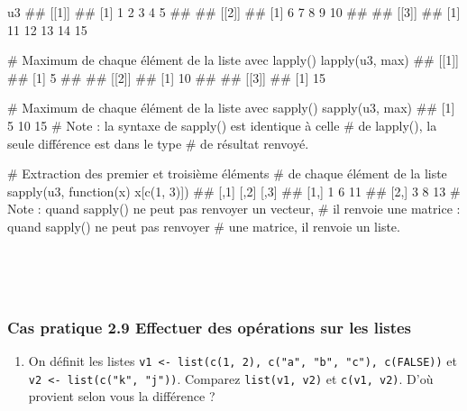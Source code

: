 \documentclass[12pt,twosided, notitlepage]{book}
\newenvironment{Shaded}{}{}
\newcommand{\CommentTok}[1]{\textcolor[rgb]{0.00,0.50,0.00}{#1}}
\newcommand{\ControlFlowTok}[1]{\textcolor[rgb]{0.00,0.00,1.00}{#1}}
\newcommand{\DecValTok}[1]{#1}
\newcommand{\KeywordTok}[1]{\textcolor[rgb]{0.00,0.00,1.00}{#1}}
\newcommand{\NormalTok}[1]{#1}
\providecommand{\tightlist}{%
  \setlength{\itemsep}{0pt}\setlength{\parskip}{0pt}}
\renewenvironment{Shaded}{\begin{snugshade}}{\end{snugshade}}
\begin{document}
\begin{Shaded}
\begin{Highlighting}[]
\NormalTok{u3}
\NormalTok{  ## [[1]]}
\NormalTok{  ## [1] 1 2 3 4 5}
\NormalTok{  ## }
\NormalTok{  ## [[2]]}
\NormalTok{  ## [1]  6  7  8  9 10}
\NormalTok{  ## }
\NormalTok{  ## [[3]]}
\NormalTok{  ## [1] 11 12 13 14 15}

\CommentTok{# Maximum de chaque élément de la liste avec lapply()}
\KeywordTok{lapply}\NormalTok{(u3, max)}
\NormalTok{  ## [[1]]}
\NormalTok{  ## [1] 5}
\NormalTok{  ## }
\NormalTok{  ## [[2]]}
\NormalTok{  ## [1] 10}
\NormalTok{  ## }
\NormalTok{  ## [[3]]}
\NormalTok{  ## [1] 15}

\CommentTok{# Maximum de chaque élément de la liste avec sapply()}
\KeywordTok{sapply}\NormalTok{(u3, max)}
\NormalTok{  ## [1]  5 10 15}
\CommentTok{# Note : la syntaxe de sapply() est identique à celle}
\CommentTok{# de lapply(), la seule différence est dans le type}
\CommentTok{# de résultat renvoyé.}

\CommentTok{# Extraction des premier et troisième éléments }
\CommentTok{# de chaque élément de la liste}
\KeywordTok{sapply}\NormalTok{(u3, }\ControlFlowTok{function}\NormalTok{(x) x[}\KeywordTok{c}\NormalTok{(}\DecValTok{1}\NormalTok{, }\DecValTok{3}\NormalTok{)])}
\NormalTok{  ##      [,1] [,2] [,3]}
\NormalTok{  ## [1,]    1    6   11}
\NormalTok{  ## [2,]    3    8   13}
\CommentTok{# Note : quand sapply() ne peut pas renvoyer un vecteur, }
\CommentTok{# il renvoie une matrice : quand sapply() ne peut pas renvoyer}
\CommentTok{# une matrice, il renvoie un liste. }
\end{Highlighting}
\end{Shaded}

~

~

\hypertarget{cas-pratique-2.9-effectuer-des-operations-sur-les-listes}{%
\subsubsection{\texorpdfstring{\textbf{Cas pratique 2.9} Effectuer des
opérations sur les
listes}{Cas pratique 2.9 Effectuer des opérations sur les listes}}\label{cas-pratique-2.9-effectuer-des-operations-sur-les-listes}}


\begin{enumerate}
\def\labelenumi{\alph{enumi}.}
\tightlist
\item
  On définit les listes
  \texttt{v1\ \textless{}-\ list(c(1,\ 2),\ c("a",\ "b",\ "c"),\ c(FALSE))}
  et \texttt{v2\ \textless{}-\ list(c("k",\ "j"))}. Comparez
  \texttt{list(v1,\ v2)} et \texttt{c(v1,\ v2)}. D'où provient selon
  vous la différence ?
\end{enumerate}
\end{document}
